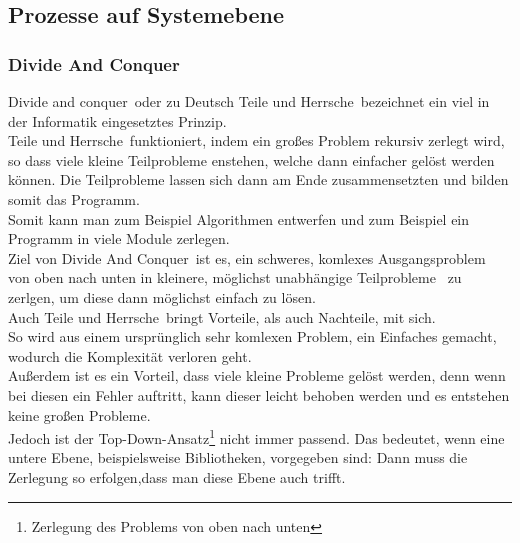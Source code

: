 \documentclass[a4paper, 10pt]{scrartcl}
\begin{document}
\subsection{Prozesse auf Systemebene}
\subsubsection{Divide And Conquer}
\glqq Divide and conquer\grqq\ oder zu Deutsch \glqq Teile und Herrsche\grqq\ bezeichnet ein viel in der Informatik eingesetztes Prinzip.\\
 \glqq Teile und Herrsche\grqq \ funktioniert, indem ein großes Problem rekursiv zerlegt wird, so dass viele kleine Teilprobleme enstehen, welche dann einfacher gelöst werden können. Die Teilprobleme lassen sich dann am Ende zusammensetzten und bilden somit das Programm.\\
Somit kann man zum Beispiel Algorithmen entwerfen und zum Beispiel ein Programm in viele Module zerlegen.\\
Ziel von \glqq Divide And Conquer\grqq\  ist es, ein schweres, komlexes Ausgangsproblem von oben nach unten \glqq in kleinere, möglichst unabhängige Teilprobleme\grqq \ \cite{goll_entwurfsprinzipien} zu zerlgen, um diese dann möglichst einfach zu lösen.\\
Auch \glqq Teile und Herrsche\grqq\  bringt Vorteile, als auch Nachteile, mit sich.\\
So wird aus einem ursprünglich sehr komlexen Problem, ein Einfaches gemacht, wodurch die Komplexität verloren geht.\\
Außerdem ist es ein Vorteil, dass viele kleine Probleme gelöst werden, denn wenn bei diesen ein Fehler auftritt, kann dieser leicht behoben werden und es entstehen keine großen Probleme.\\
Jedoch ist der Top-Down-Ansatz\footnote[3]{Zerlegung des Problems von oben nach unten} nicht immer passend. Das bedeutet, \glqq wenn eine untere Ebene, beispielsweise Bibliotheken, vorgegeben sind: Dann muss die Zerlegung so erfolgen,dass man diese Ebene auch \glqq trifft\grqq .\grqq \ \cite{goll_entwurfsprinzipien}
\end{document}
